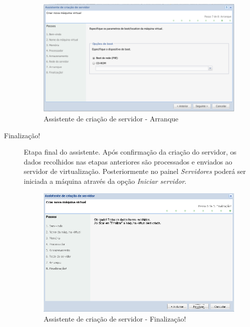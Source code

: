 \begin{description}
		\begin{figure}[H]
			\begin{center}
			\includegraphics[scale=0.5]{screenshots/server_createwiz_startup.png}
			\caption{Assistente de criação de servidor - Arranque}
			\label{fig:server_createwiz_startup}
			\end{center}
		\end{figure}

	\item[Finalização!] Etapa final do assistente. Após confirmação da criação do servidor, os dados recolhidos nas etapas anteriores são processados e enviados ao servidor de virtualização. Posteriormente no painel \emph{Servidores} poderá ser iniciada a máquina através da opção \emph{Iniciar servidor}.
		\begin{figure}[H]
			\begin{center}
			\includegraphics[scale=0.5]{screenshots/server_createwiz_finish.png}
			\caption{Assistente de criação de servidor - Finalização!}
			\label{fig:server_createwiz_finish}
			\end{center}
		\end{figure}

\end{description}

